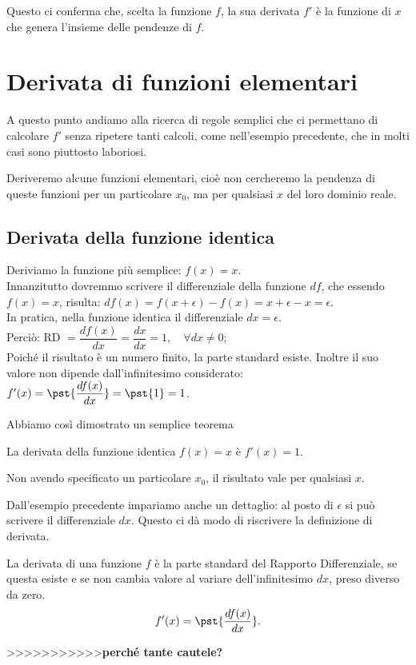 Questo ci conferma che, scelta la funzione \(f\), la sua derivata \(f'\) è la 
funzione di \(x\) che genera l'insieme delle pendenze di \(f\).



\section{Derivata di funzioni elementari}
\label{sec:differenziazione_derivatafelementari}
A questo punto andiamo alla ricerca di regole semplici che ci permettano di 
calcolare \(f'\) senza ripetere tanti calcoli, come nell'esempio precedente, 
che in molti casi sono piuttosto laboriosi.

Deriveremo alcune funzioni elementari, cioè non cercheremo la pendenza di 
queste funzioni per un particolare \(x_0\), ma per qualsiasi \(x\) del loro 
dominio reale.
\subsection{Derivata della funzione identica}
\label{subsec:differenziazione_derivatafidentica}
\begin{esempio}
 Deriviamo la funzione più semplice: $f(x)=x$.\\
 Innanzitutto dovremmo scrivere il differenziale della funzione \(df\), che 
essendo \(f(x)=x\), risulta: \(df(x)=f(x+\epsilon)-f(x)=x+\epsilon-x=\epsilon\). 
\\
In pratica, nella funzione identica il differenziale \(dx=\epsilon\).\\
Perciò: RD \(=\dfrac{df(x)}{dx}=\dfrac{dx}{dx}=1, \quad  \forall dx \ne 0\);\\
Poiché il risultato è un numero finito, la parte standard esiste. Inoltre il 
suo valore non dipende dall'infinitesimo considerato:\\
\(f'(x)=\pst{\dfrac{df(x)}{dx}}=\pst{1}=1\).\\
\end{esempio}
Abbiamo così dimostrato un semplice teorema
\begin{teorema}
 La derivata della funzione identica \(f(x)=x\) è \(f'(x)=1\).
\end{teorema}
\begin{osservazione}
 Non avendo specificato un particolare \(x_0\), il risultato vale per qualsiasi 
\(x\).
\end{osservazione}

Dall'esempio precedente impariamo anche un dettaglio: al 
posto di \(\epsilon\) si può scrivere il differenziale \(dx\). Questo ci dà 
modo di riscrivere la definizione di derivata.
\begin{definizione}
 La derivata di una funzione \(f\) è la parte standard del Rapporto 
Differenziale, se questa esiste e se non cambia valore al variare 
dell'infinitesimo \(dx\), preso diverso da zero.
\[
 f'(x)=\pst{\frac{df(x)}{dx}}.
\]
\end{definizione}
>>>>>>>>>>>\textbf{perché tante cautele?}

